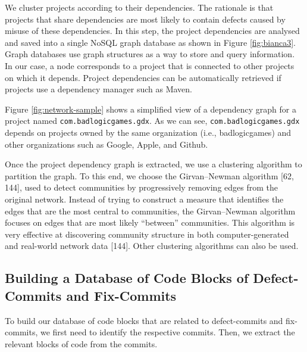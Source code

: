 \documentclass[12pt]{report}
\begin{document}
We cluster projects according to their dependencies. The rationale is
that projects that share dependencies are most likely to contain defects
caused by misuse of these dependencies. In this step, the project
dependencies are analysed and saved into a single NoSQL graph database
as shown in Figure \ref{fig:bianca3}. Graph databases use graph
structures as a way to store and query information. In our case, a node
corresponds to a project that is connected to other projects on which it
depends. Project dependencies can be automatically retrieved if projects
use a dependency manager such as Maven.

Figure \ref{fig:network-sample} shows a simplified view of a dependency
graph for a project named \texttt{com.badlogicgames.gdx}. As we can see,
\texttt{com.badlogicgames.gdx} depends on projects owned by the same
organization (i.e., badlogicgames) and other organizations such as
Google, Apple, and Github.



Once the project dependency graph is extracted, we use a clustering
algorithm to partition the graph. To this end, we choose the
Girvan--Newman algorithm {[}62, 144{]}, used to detect communities by
progressively removing edges from the original network. Instead of
trying to construct a measure that identifies the edges that are the
most central to communities, the Girvan--Newman algorithm focuses on
edges that are most likely ``between'' communities. This algorithm is
very effective at discovering community structure in both
computer-generated and real-world network data {[}144{]}. Other
clustering algorithms can also be used.

\subsection{Building a Database of Code Blocks of Defect-Commits and
Fix-Commits}\label{sec:offline}

To build our database of code blocks that are related to defect-commits
and fix-commits, we first need to identify the respective commits. Then,
we extract the relevant blocks of code from the commits.
\end{document}

